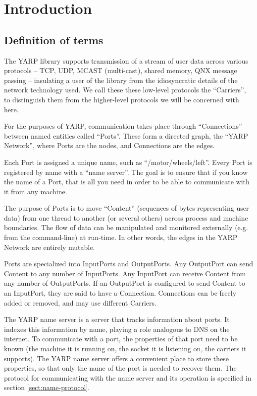 
\chapter{Introduction}



\section{Definition of terms}

The YARP library supports transmission of a stream of
user data across
various protocols -- TCP, UDP, MCAST (multi-cast), shared memory, QNX
message passing -- insulating a user of the library from the
idiosyncratic details of the network technology used.  We call these
these low-level protocols the ``Carriers'', to distinguish them from
the higher-level protocols we will be concerned with here.

For the purposes of YARP, communication takes place through
``Connections'' between named entities called ``Ports''.
These form a directed graph, the ``YARP Network'', where Ports are the nodes,
and Connections are the edges.

Each Port is assigned a unique name, such as ``/motor/wheels/left''.  
Every Port is registered by name with
a ``name server''.  The goal is to ensure that if you know the name
of a Port, that is all you need in order to be able to 
communicate with it from any machine.

The purpose of Ports is to move ``Content'' (sequences of bytes representing 
user data) from
one thread to another (or several others) across process and machine
boundaries.  The flow of data can be manipulated and monitored
externally (e.g. from the command-line) at run-time.  In other words,
the edges in the YARP Network are entirely mutable.

Ports are specialized into InputPorts and OutputPorts.
Any OutputPort can send Content to any number of InputPorts.  Any
InputPort can receive Content from any number of OutputPorts.  If an
OutputPort is configured to send Content to an InputPort, they are
said to have a Connection.  Connections can be freely added or 
removed, and may use different Carriers.

The YARP name server is a server that tracks information about ports.
It indexes this information by name, playing a role analogous to
DNS on the internet.
%
To communicate with a port, the properties of that port need to be
known (the machine it is running on, the socket it is listening on,
the carriers it supports).  The YARP name server offers a convenient
place to store these properties, so that only the name of the port is
needed to recover them.
%
The protocol for communicating with the name server
and its operation is specified in section \ref{sect:name-protocol}.

